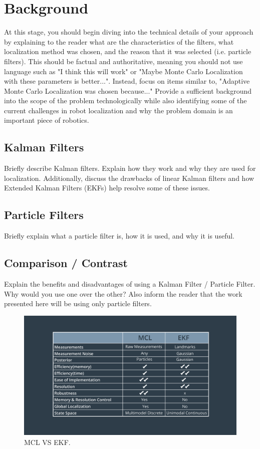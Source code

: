 \documentclass[10pt,journal,compsoc]{IEEEtran}
\begin{document}
\section{Background}
At this stage, you should begin diving into the technical details of your approach by explaining to the reader what are the characteristics of the filters, what localization method was chosen, and the reason that it was selected (i.e. particle filters). 
This should be factual and authoritative, meaning you should not use language such as "I think this will work" or "Maybe Monte Carlo Localization with these parameters is better...". Instead, focus on items similar to, "Adaptive Monte Carlo Localization was chosen because..."
Provide a sufficient background into the scope of the problem technologically while also identifying some of the current challenges in robot localization and why the problem domain is an important piece of robotics.\cite{lamport1994latex}

\subsection{Kalman Filters}
Briefly describe Kalman filters. Explain how they work and why they are used for localization. Additionally, discuss the drawbacks of linear Kalman filters and how Extended Kalman Filters (EKFs) help resolve some of these issues.

\subsection{Particle Filters}
Briefly explain what a particle filter is, how it is used, and why it is useful.
\subsection{Comparison / Contrast}
Explain the benefits and disadvantages of using a Kalman Filter / Particle Filter. Why would you use one over the other? Also inform the reader that the work presented here will be using only particle filters. 
\begin{figure}[thpb]
      \centering
      \includegraphics[width=\linewidth]{mclVsEKF.png}
      \caption{MCL VS EKF.}
      \label{fig:robot1}
\end{figure}
\end{document}
